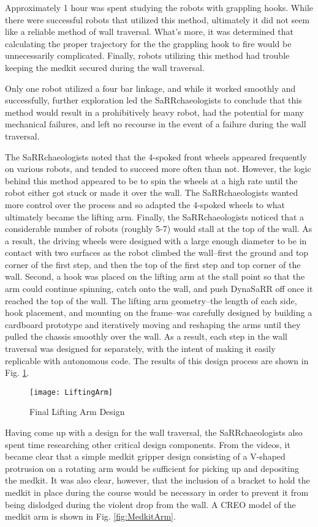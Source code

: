 Approximately 1 hour was spent studying the robots with grappling hooks. While there were successful robots that utilized this method, ultimately it did not seem like a reliable method of wall traversal. What's more, it was determined that calculating the proper trajectory for the the grappling hook to fire would be unnecessarily complicated. Finally, robots utilizing this method had trouble keeping the medkit secured during the wall traversal.

Only one robot utilized a four bar linkage, and while it worked smoothly and successfully, further exploration led the SaRRchaeologists to conclude that this method would result in a prohibitively heavy robot, had the potential for many mechanical failures, and left no recourse in the event of a failure during the wall traversal. 

The SaRRchaeologists noted that the 4-spoked front wheels appeared frequently on various robots, and tended to succeed more often than not. However, the logic behind this method appeared to be to spin the wheels at a high rate until the robot either got stuck or made it over the wall. The SaRRchaeologists wanted more control over the process and so adapted the 4-spoked wheels to what ultimately became the lifting arm. Finally, the SaRRchaeologists noticed that a considerable number of robots (roughly 5-7) would stall at the top of the wall. As a result, the driving wheels were designed with a large enough diameter to be in contact with two surfaces as the robot climbed the wall--first the ground and top corner of the first step, and then the top of the first step and top corner of the wall. Second, a hook was placed on the lifting arm at the stall point so that the arm could continue spinning, catch onto the wall, and push DynaSaRR off once it reached the top of the wall. The lifting arm geometry--the length of each side, hook placement, and mounting on the frame--was carefully designed by building a cardboard prototype and iteratively moving and reshaping the arms until they pulled the chassis smoothly over the wall. As a result, each step in the wall traversal was designed for separately, with the intent of making it easily replicable with autonomous code. The results of this design process are shown in Fig. \ref{fig:LiftingArm}.
\begin{figure}[ht]
    \texttt{[image: LiftingArm]}
    \caption{Final Lifting Arm Design}
    \label{fig:LiftingArm}
\end{figure}


Having come up with a design for the wall traversal, the SaRRchaeologists also spent time researching other critical design components. From the videos, it became clear that a simple medkit gripper design consisting of a V-shaped protrusion on a rotating arm would be sufficient for picking up and depositing the medkit. It was also clear, however, that the inclusion of a bracket to hold the medkit in place during the course would be necessary in order to prevent it from being dislodged during the violent drop from the wall. A CREO model of the medkit arm is shown in Fig. \ref{fig:MedkitArm}.


